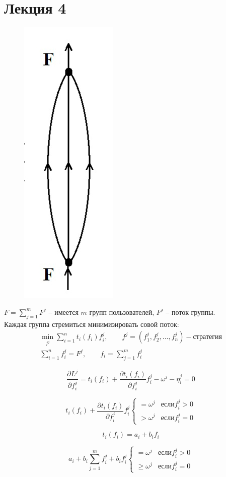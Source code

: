 \documentclass[12pt,a4paper,titlepage,oneside]{book}
\theoremstyle{definition}
\theoremstyle{plain}
\theoremstyle{remark}
\theoremstyle{remark}
\theoremstyle{plain}
\theoremstyle{plain}
\begin{document}
\chapter{Лекция 4}


\begin{figure}[h]
	\centering
	\includegraphics[width=0.1\linewidth]{img441.jpg}
	\caption{} \label{img:img44.1}
\end{figure}
$F = \sum\limits_{j=1}^m F^j$ -- имеется $m$ групп пользователей,
$F^j$ -- поток группы.\\ 
Каждая группа стремиться минимизировать совой поток:
\begin{gather*}
\min\limits_{f^j} \sum\limits_{i=1}^n t_i(f_i)f_i^j, \qquad f^j = (f_1^j, f_2^j, \dots, f_n^j) - \text{стратегия} \\
\sum\limits_{i=1}^n f_i^j = F^j, \qquad f_i = \sum\limits_{j=1}^m f_i^j
\end{gather*}

\begin{equation*}
\frac{\partial L^j}{\partial f_i^j} = t_i(f_i)+ \frac{\partial t_i(f_i)}{\partial f_i^j}f_i^j - \omega^j-\eta_i^j = 0
\end{equation*}

\begin{equation*}
t_i(f_i) + \frac{\partial t_i(f_i)}{\partial f_i^j}f_i^j \begin{cases} = \omega^j & если f_i^j > 0\\
> \omega^j & если f_i^j = 0 
\end{cases}
\end{equation*}

\begin{equation*}
t_i(f_i) = a_i + b_if_i
\end{equation*}

\begin{equation*}
a_i+b_i \sum\limits_{j=1}^m f_i^j + b_i f_i^j \begin{cases} = \omega^j & если f_i^j > 0\\
\geq \omega^j & если f_i^j = 0 
\end{cases}
\end{equation*}
\end{document}
